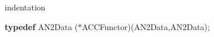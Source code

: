 %
%
\expandafter\ifx\csname indentation\endcsname\relax%
\newlength{\indentation}\fi
\setlength{\indentation}{0.5em}
\begin{flushleft}
{\bf typedef} AN2Data ($\ast$ACCFunctor)(AN2Data,AN2Data);\mbox{}\\
\end{flushleft}
